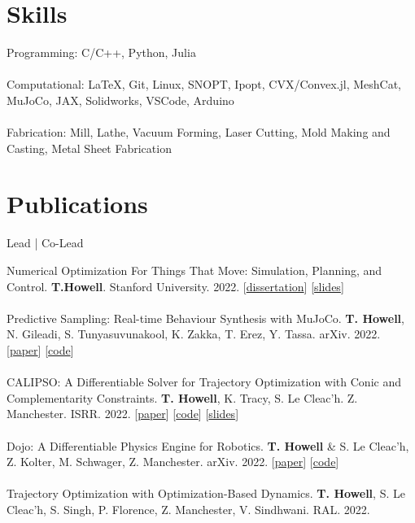 \documentclass[10pt]{article}
\begin{document}
\section*{Skills}
Programming: C/C++, Python, Julia
\\
\\
Computational: \LaTeX, Git, Linux, SNOPT, Ipopt, CVX/Convex.jl, MeshCat, MuJoCo, JAX, Solidworks, VSCode, Arduino
\\
\\
Fabrication: Mill, Lathe, Vacuum Forming, Laser Cutting, Mold Making and Casting, Metal Sheet Fabrication

\section*{Publications}
\begin{center} Lead | Co-Lead \end{center}
Numerical Optimization For Things That Move: Simulation, Planning, and Control. \textbf{T.Howell}. Stanford University. 2022. 
[\href{https://github.com/thowell/thesis/blob/main/main.pdf}{dissertation}]
[\href{https://docs.google.com/presentation/d/1ypalKNcd1hAI59Fur3mFP5FYANqrQ1Smk2gUb-UiBIA/edit?usp=sharing}{slides}]
\\
\\
Predictive Sampling: Real-time Behaviour Synthesis with MuJoCo. \textbf{T. Howell}, N. Gileadi, S. Tunyasuvunakool, K. Zakka, T. Erez, Y. Tassa. arXiv. 2022. 
[\href{https://arxiv.org/abs/2212.00541}{paper}]
[\href{https://github.com/deepmind/mujoco_mpc}{code}]
\\
\\
CALIPSO: A Differentiable Solver for Trajectory Optimization with Conic and Complementarity Constraints. \textbf{T. Howell}, K. Tracy, S. Le Cleac'h. Z. Manchester. ISRR. 2022.
[\href{https://arxiv.org/abs/2205.09255}{paper}]
[\href{https://github.com/thowell/CALIPSO.jl}{code}]
[\href{https://slides.com/taylorhowell/calipso}{slides}]
\\
\\
Dojo: A Differentiable Physics Engine for Robotics. \textbf{T. Howell} \& S. Le Cleac'h, Z. Kolter, M. Schwager, Z. Manchester. arXiv. 2022. 
[\href{https://arxiv.org/abs/2203.00806}{paper}]
[\href{https://github.com/dojo-sim}{code}]
\\
\\
Trajectory Optimization with Optimization-Based Dynamics. \textbf{T. Howell}, S. Le Cleac'h, S. Singh, P. Florence, Z. Manchester, V. Sindhwani. RAL. 2022. 
\end{document}
